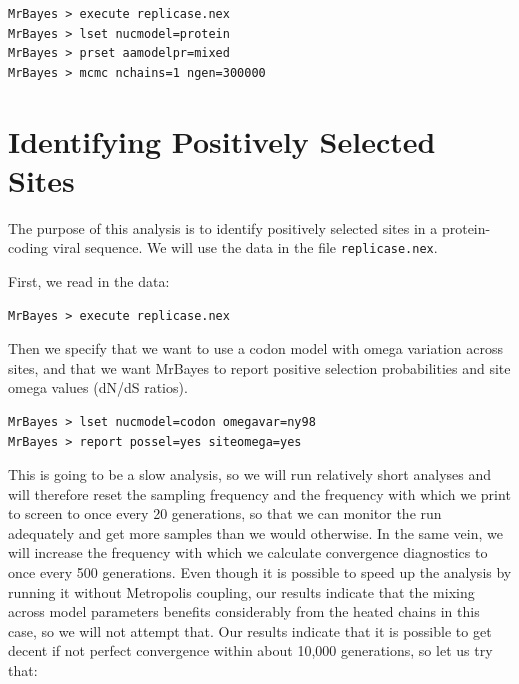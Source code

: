 \documentclass[12pt]{book}
\newcommand{\ttt}[1]{\texttt{#1}}
\begin{document}
\begin{singlespacing}
\footnotesize
\begin{verbatim}
MrBayes > execute replicase.nex
MrBayes > lset nucmodel=protein
MrBayes > prset aamodelpr=mixed
MrBayes > mcmc nchains=1 ngen=300000
\end{verbatim}
\normalsize
\end{singlespacing}

\section{Identifying Positively Selected Sites}
The purpose of this analysis is to identify positively selected sites in a protein-coding viral
sequence. We will use the data in the file \ttt{replicase.nex}.

First, we read in the data:

\begin{singlespacing}
\footnotesize
\begin{verbatim}
MrBayes > execute replicase.nex
\end{verbatim}
\normalsize
\end{singlespacing}

Then we specify that we want to use a codon model with omega variation across sites, and that we
want MrBayes to report positive selection probabilities and site omega values (dN/dS ratios).

\begin{singlespacing}
\footnotesize
\begin{verbatim}
MrBayes > lset nucmodel=codon omegavar=ny98
MrBayes > report possel=yes siteomega=yes
\end{verbatim}
\normalsize
\end{singlespacing}

This is going to be a slow analysis, so we will run relatively short analyses and will therefore
reset the sampling frequency and the frequency with which we print to screen to once every 20
generations, so that we can monitor the run adequately and get more samples than we would
otherwise. In the same vein, we will increase the frequency with which we calculate convergence
diagnostics to once every 500 generations. Even though it is possible to speed up the analysis by
running it without Metropolis coupling, our results indicate that the mixing across model
parameters benefits considerably from the heated chains in this case, so we will not attempt that.
Our results indicate that it is possible to get decent if not perfect convergence within about
10,000 generations, so let us try that:
\end{document}
